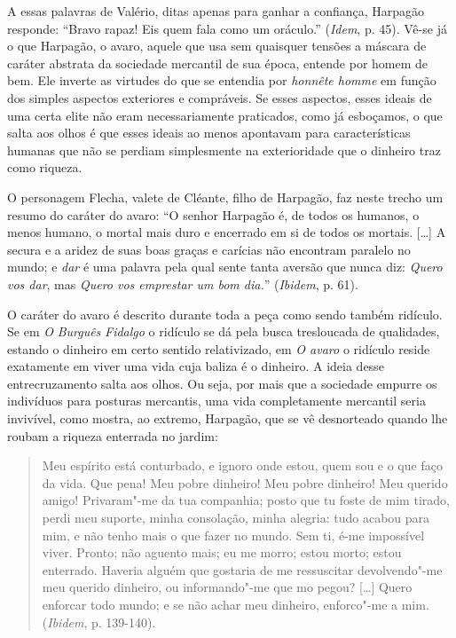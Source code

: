 A essas palavras de Valério, ditas apenas para ganhar a confiança,
Harpagão responde: ``Bravo rapaz! Eis quem fala como um oráculo.''
(\emph{Idem}, p. 45). Vê-se já o que Harpagão, o avaro, aquele que usa
sem quaisquer tensões a máscara de caráter abstrata da sociedade
mercantil de sua época, entende por homem de bem. Ele inverte as
virtudes do que se entendia por \emph{honnête homme} em função dos
simples aspectos exteriores e compráveis. Se esses aspectos, esses
ideais de uma certa elite não eram necessariamente praticados, como já
esboçamos, o que salta aos olhos é que esses ideais ao menos apontavam
para características humanas que não se perdiam simplesmente na
exterioridade que o dinheiro traz como riqueza.

O personagem Flecha, valete de Cléante, filho de Harpagão, faz neste
trecho um resumo do caráter do avaro: ``O senhor Harpagão é, de todos os
humanos, o menos humano, o mortal mais duro e encerrado em si de todos
os mortais. [\ldots{}] A secura e a aridez de suas boas graças e
carícias não encontram paralelo no mundo; e \emph{dar} é uma palavra
pela qual sente tanta aversão que nunca diz: \emph{Quero vos dar}, mas
\emph{Quero vos emprestar um bom dia.}'' (\emph{Ibidem}, p. 61).

O caráter do avaro é descrito durante toda a peça como sendo também
ridículo. Se em \emph{O} \emph{Burguês} \emph{Fidalgo} o ridículo se dá
pela busca tresloucada de qualidades, estando o dinheiro em certo
sentido relativizado, em \emph{O avaro} o ridículo reside exatamente em
viver uma vida cuja baliza é o dinheiro. A ideia desse entrecruzamento
salta aos olhos. Ou seja, por mais que a sociedade empurre os indivíduos
para posturas mercantis, uma vida completamente mercantil seria
invivível, como mostra, ao extremo, Harpagão, que se vê desnorteado
quando lhe roubam a riqueza enterrada no jardim:

\begin{quote}
Meu espírito está conturbado, e ignoro onde estou, quem sou e o que faço
da vida. Que pena! Meu pobre dinheiro! Meu pobre dinheiro! Meu querido
amigo! Privaram"-me da tua companhia; posto que tu foste de mim tirado,
perdi meu suporte, minha consolação, minha alegria: tudo acabou para
mim, e não tenho mais o que fazer no mundo. Sem ti, é-me impossível
viver. Pronto; não aguento mais; eu me morro; estou morto; estou
enterrado. Haveria alguém que gostaria de me ressuscitar devolvendo"-me
meu querido dinheiro, ou informando"-me que mo pegou? [\ldots{}]
Quero enforcar todo mundo; e se não achar meu dinheiro, enforco"-me a
mim. (\emph{Ibidem}, p. 139-140).
\end{quote}

